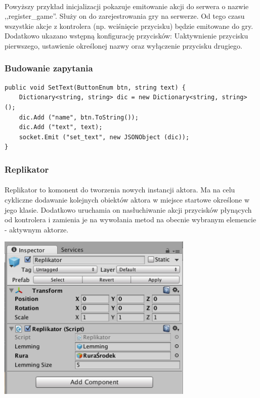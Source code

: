 \paragraph{}
Powyższy przykład inicjalizacji pokazuje emitowanie akcji do serwera o nazwie ,,register\_game''. Służy on do zarejestrowania gry na serwerze. Od tego czasu wszystkie akcje z kontrolera (np. wciśnięcie przycisku) będzie emitowane do gry.
Dodatkowo ukazano wstępną konfigurację przycisków: Uaktywnienie przycisku pierwszego, ustawienie określonej nazwy oraz wyłączenie przycisku drugiego.

\subsubsection{Budowanie zapytania}

\begin{lstlisting}[language=CSharp]
public void SetText(ButtonEnum btn, string text) {
	Dictionary<string, string> dic = new Dictionary<string, string> ();
	dic.Add ("name", btn.ToString());
	dic.Add ("text", text);
	socket.Emit ("set_text", new JSONObject (dic));
}
\end{lstlisting}

\subsubsection{Replikator}
\paragraph{}
Replikator to komonent do tworzenia nowych instancji aktora. Ma na celu cykliczne dodawanie kolejnych obiektów aktora w miejsce startowe określone w jego klasie. Dodatkowo uruchamia on nasłuchiwanie akcji przycisków płynących od kontrolera i zamienia je na wywołania metod na obecnie wybranym elemencie - aktywnym aktorze.

\begin{center}
\includegraphics[width=0.7\textwidth]{images/replikator.png}
\end{center}

